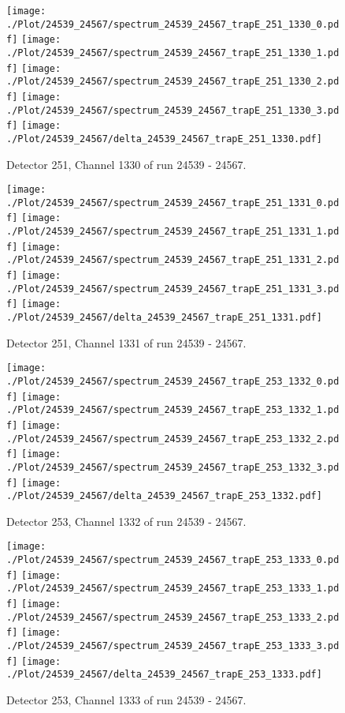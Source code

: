 \clearpage
\begin{figure}[hb]
\centering
\texttt{[image: ./Plot/24539\_24567/spectrum\_24539\_24567\_trapE\_251\_1330\_0.pdf]}
\texttt{[image: ./Plot/24539\_24567/spectrum\_24539\_24567\_trapE\_251\_1330\_1.pdf]}
\texttt{[image: ./Plot/24539\_24567/spectrum\_24539\_24567\_trapE\_251\_1330\_2.pdf]}
\texttt{[image: ./Plot/24539\_24567/spectrum\_24539\_24567\_trapE\_251\_1330\_3.pdf]}
\texttt{[image: ./Plot/24539\_24567/delta\_24539\_24567\_trapE\_251\_1330.pdf]}
\caption{ Detector 251, Channel 1330 of run 24539 - 24567.}
\label{fig:24539_24567_trapE_251_1330}
\end{figure}
\clearpage
\begin{figure}[hb]
\centering
\texttt{[image: ./Plot/24539\_24567/spectrum\_24539\_24567\_trapE\_251\_1331\_0.pdf]}
\texttt{[image: ./Plot/24539\_24567/spectrum\_24539\_24567\_trapE\_251\_1331\_1.pdf]}
\texttt{[image: ./Plot/24539\_24567/spectrum\_24539\_24567\_trapE\_251\_1331\_2.pdf]}
\texttt{[image: ./Plot/24539\_24567/spectrum\_24539\_24567\_trapE\_251\_1331\_3.pdf]}
\texttt{[image: ./Plot/24539\_24567/delta\_24539\_24567\_trapE\_251\_1331.pdf]}
\caption{ Detector 251, Channel 1331 of run 24539 - 24567.}
\label{fig:24539_24567_trapE_251_1331}
\end{figure}
\clearpage
\begin{figure}[hb]
\centering
\texttt{[image: ./Plot/24539\_24567/spectrum\_24539\_24567\_trapE\_253\_1332\_0.pdf]}
\texttt{[image: ./Plot/24539\_24567/spectrum\_24539\_24567\_trapE\_253\_1332\_1.pdf]}
\texttt{[image: ./Plot/24539\_24567/spectrum\_24539\_24567\_trapE\_253\_1332\_2.pdf]}
\texttt{[image: ./Plot/24539\_24567/spectrum\_24539\_24567\_trapE\_253\_1332\_3.pdf]}
\texttt{[image: ./Plot/24539\_24567/delta\_24539\_24567\_trapE\_253\_1332.pdf]}
\caption{ Detector 253, Channel 1332 of run 24539 - 24567.}
\label{fig:24539_24567_trapE_253_1332}
\end{figure}
\clearpage
\begin{figure}[hb]
\centering
\texttt{[image: ./Plot/24539\_24567/spectrum\_24539\_24567\_trapE\_253\_1333\_0.pdf]}
\texttt{[image: ./Plot/24539\_24567/spectrum\_24539\_24567\_trapE\_253\_1333\_1.pdf]}
\texttt{[image: ./Plot/24539\_24567/spectrum\_24539\_24567\_trapE\_253\_1333\_2.pdf]}
\texttt{[image: ./Plot/24539\_24567/spectrum\_24539\_24567\_trapE\_253\_1333\_3.pdf]}
\texttt{[image: ./Plot/24539\_24567/delta\_24539\_24567\_trapE\_253\_1333.pdf]}
\caption{ Detector 253, Channel 1333 of run 24539 - 24567.}
\label{fig:24539_24567_trapE_253_1333}
\end{figure}
